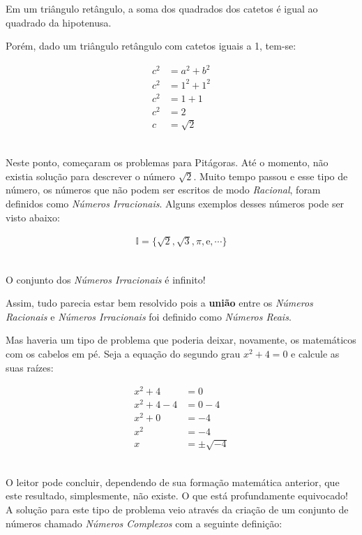 \begin{theorem}
	Em um triângulo retângulo, a soma dos quadrados dos catetos é igual ao quadrado da hipotenusa.
\end{theorem}


Porém, dado um triângulo retângulo com catetos iguais a 1, tem-se:

\begin{ceqn}
\begin{align*}
c^2 &= a^2 + b^2 \\
c^2 &= 1^2 + 1^2 \\
c^2 &= 1+1 \\
c^2 &= 2 \\
c &= \sqrt{2}
\end{align*}
\end{ceqn}
\\
\indent Neste ponto, começaram os problemas para Pitágoras. Até o momento, não existia solução para descrever o número $\sqrt{2}$. Muito tempo passou e esse tipo de número, os números que não podem ser escritos de modo \textit{Racional}, foram definidos como \textit{Números Irracionais}. Alguns exemplos desses números pode ser visto abaixo:

\begin{ceqn}
	\begin{align*}
	\mathbb{I}=\{\sqrt{2}, \sqrt{3}, \pi, \mathrm{e}, \cdots \}
	\end{align*}
\end{ceqn}
\\
\indent O conjunto dos \textit{Números Irracionais} é infinito!

Assim, tudo parecia estar bem resolvido pois a \textbf{união} entre os \textit{Números Racionais} e \textit{Números Irracionais} foi definido como \textit{Números Reais}.

Mas haveria um tipo de problema que poderia deixar, novamente, os matemáticos com os cabelos em pé. Seja a equação do segundo grau $x^2+4=0$ e calcule as suas raízes:

\begin{ceqn}
	\begin{align}\label{complexo}
	x^2+4&=0 \\ \nonumber
	x^2+4-4&=0-4 \\ \nonumber
	x^2 + 0 &= -4 \\ \nonumber
	x^2 &= -4 \\ \nonumber
	x &= \pm \sqrt{-4} 
	\end{align}
\end{ceqn}
\\
\indent O leitor pode concluir, dependendo de sua formação matemática anterior, que este resultado, simplesmente, não existe. O que está profundamente equivocado!
\\
\indent A solução para este tipo de problema veio através da criação de um conjunto de números chamado \textit{Números Complexos} com a seguinte definição:


